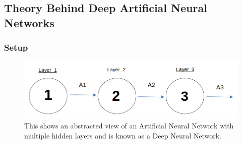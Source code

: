\documentclass[./project-report/src/latex/project-report.tex]{subfiles}
\begin{document}
\vspace{5mm}
\subsection{Theory Behind Deep Artificial Neural Networks}
\vspace{5mm}

\subsubsection{Setup}

\pagebreak

\begin{figure}[h!]
\centering
\includegraphics[width=1\textwidth]{./project-report/src/images/deep-ann-diagram.png}
\caption{This shows an abstracted view of an Artificial Neural Network with multiple hidden layers and is known as a Deep Neural Network.}
\end{figure}
\end{document}

